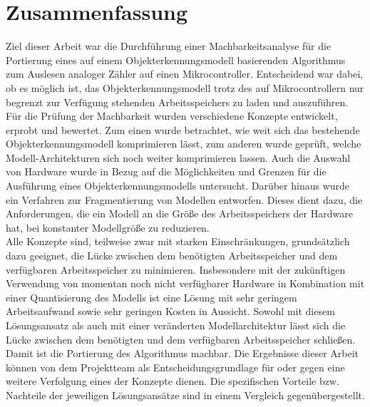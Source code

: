 \chapter{Zusammenfassung}\label{ch:Zusammenfassung}
	Ziel dieser Arbeit war die Durchführung einer Machbarkeitsanalyse für die Portierung eines auf einem Objekterkennungsmodell basierenden Algorithmus zum Auslesen analoger Zähler auf einen Mikrocontroller. Entscheidend war dabei, ob es möglich ist, das Objekterkennungsmodell trotz des auf Mikrocontrollern nur begrenzt zur Verfügung stehenden Arbeitsspeichers zu laden und auszuführen.\\ Für die Prüfung der Machbarkeit wurden verschiedene Konzepte entwickelt, erprobt und bewertet. Zum einen wurde betrachtet, wie weit sich das bestehende Objekterkennungsmodell komprimieren lässt, zum anderen wurde geprüft, welche Modell-Architekturen sich noch weiter komprimieren lassen. Auch die Auswahl von Hardware wurde in Bezug auf die Möglichkeiten und Grenzen für die Ausführung eines Objekterkennungsmodells untersucht. Darüber hinaus wurde ein Verfahren zur Fragmentierung von Modellen entworfen. Dieses dient dazu, die Anforderungen, die ein Modell an die Größe des Arbeitsspeichers der Hardware hat, bei konstanter Modellgröße zu reduzieren.\\ Alle Konzepte sind, teilweise zwar mit starken Einschränkungen, grundsätzlich dazu geeignet, die Lücke zwischen dem benötigten Arbeitsspeicher und dem verfügbaren Arbeitsspeicher zu minimieren. Insbesondere mit der zukünftigen Verwendung von momentan noch nicht verfügbarer Hardware in Kombination mit einer Quantisierung des Modells ist eine Lösung mit sehr geringem Arbeitsaufwand sowie sehr geringen Kosten in Aussicht. Sowohl mit diesem Lösungsansatz als auch mit einer veränderten Modellarchitektur lässt sich die Lücke zwischen dem benötigten und dem verfügbaren Arbeitsspeicher schließen.\\ Damit ist die Portierung des Algorithmus machbar. Die Ergebnisse dieser Arbeit können von dem Projektteam als Entscheidungsgrundlage für oder gegen eine weitere Verfolgung eines der Konzepte dienen. Die spezifischen Vorteile bzw. Nachteile der jeweiligen Lösungsansätze sind in einem Vergleich gegenübergestellt.
	\glsaddall